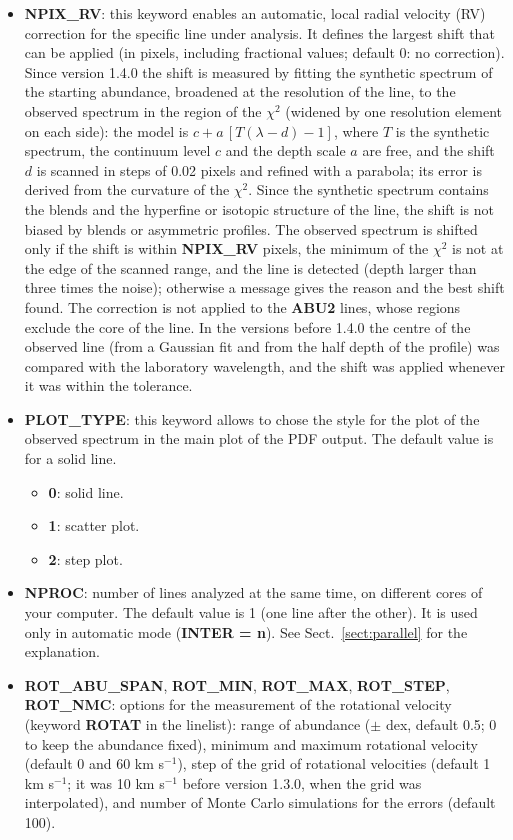 \documentclass[modern]{aastex701}
\begin{document}
\begin{itemize}
    \item {\bf NPIX\_RV}: this keyword enables an automatic, local radial velocity (RV) correction for the specific line under analysis. It defines the largest shift that can be applied (in pixels, including fractional values; default 0: no correction). Since version 1.4.0 the shift is measured by fitting the synthetic spectrum of the starting abundance, broadened at the resolution of the line, to the observed spectrum in the region of the $\chi^2$ (widened by one resolution element on each side): the model is $c + a\,[T(\lambda - d) - 1]$, where $T$ is the synthetic spectrum, the continuum level $c$ and the depth scale $a$ are free, and the shift $d$ is scanned in steps of 0.02 pixels and refined with a parabola; its error is derived from the curvature of the $\chi^2$. Since the synthetic spectrum contains the blends and the hyperfine or isotopic structure of the line, the shift is not biased by blends or asymmetric profiles. The observed spectrum is shifted only if the shift is within {\bf NPIX\_RV} pixels, the minimum of the $\chi^2$ is not at the edge of the scanned range, and the line is detected (depth larger than three times the noise); otherwise a message gives the reason and the best shift found. The correction is not applied to the {\bf ABU2} lines, whose regions exclude the core of the line. In the versions before 1.4.0 the centre of the observed line (from a Gaussian fit and from the half depth of the profile) was compared with the laboratory wavelength, and the shift was applied whenever it was within the tolerance.
    \item {\bf PLOT\_TYPE}: this keyword allows to chose the style for the plot of the observed spectrum in the main plot of the PDF output. The default value is for a solid line.
    \begin{itemize}
        \item {\bf 0}: solid line.
        \item {\bf 1}: scatter plot.
        \item {\bf 2}: step plot.
    \end{itemize}
    \item {\bf NPROC}: number of lines analyzed at the same time, on different cores of your computer. The default value is 1 (one line after the other). It is used only in automatic mode ({\bf INTER = n}). See Sect.~\ref{sect:parallel} for the explanation.
    \item {\bf ROT\_ABU\_SPAN}, {\bf ROT\_MIN}, {\bf ROT\_MAX}, {\bf ROT\_STEP}, {\bf ROT\_NMC}: options for the measurement of the rotational velocity (keyword {\bf ROTAT} in the linelist): range of abundance ($\pm$ dex, default 0.5; 0 to keep the abundance fixed), minimum and maximum rotational velocity (default 0 and 60 km s$^{-1}$), step of the grid of rotational velocities (default 1 km s$^{-1}$; it was 10 km s$^{-1}$ before version 1.3.0, when the grid was interpolated), and number of Monte Carlo simulations for the errors (default 100).

\end{itemize}
\end{document}
